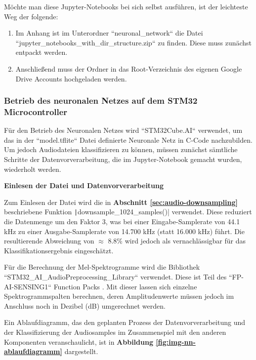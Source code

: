 Möchte man diese Jupyter-Notebooks bei sich selbst ausführen, ist der leichteste Weg der folgende:
\begin{enumerate}
  \item Im Anhang ist im Unterordner ``neuronal\_network`` die Datei ``jupyter\_notebooks\_with\_dir\_structure.zip`` zu finden. Diese muss zunächst entpackt werden.
  \item Anschließend muss der Ordner in das Root-Verzeichnis des eigenen Google Drive Accounts hochgeladen werden.
\end{enumerate}

\newpage

\subsubsection{Betrieb des neuronalen Netzes auf dem STM32 Microcontroller}
\label{sec:stm32-cube-ai}

Für den Betrieb des Neuronalen Netzes wird ``STM32Cube.AI`` verwendet, um das in der ``model.tflite`` Datei definierte Neuronale Netz in C-Code nachzubilden. Um jedoch Audiodateien klassifizieren zu können, müssen zunächst sämtliche Schritte der Datenvorverarbeitung, die im Jupyter-Notebook gemacht wurden, wiederholt werden.

\textbf{Einlesen der Datei und Datenvorverarbeitung}

Zum Einlesen der Datei wird die in \textbf{Abschnitt \ref{sec:audio-downsampling}} beschriebene Funktion \texttt|downsample_1024_samples()| verwendet. Diese reduziert die Datenmenge um den Faktor 3, was bei einer Eingabe-Samplerate von 44.1 kHz zu einer Ausgabe-Samplerate von 14.700 kHz (statt 16.000 kHz) führt. Die resultierende Abweichung von $\approx$ 8.8\% wird jedoch als vernachlässigbar für das Klassifikationsergebnis eingeschätzt.

Für die Berechnung der Mel-Spektrogramme wird die Bibliothek ``STM32\_AI\_AudioPreprocessing\_Library`` verwendet. Diese ist Teil des ``FP-AI-SENSING1`` Function Packs \cite{fp-ai-sensing1}. Mit dieser lassen sich einzelne Spektrogrammspalten berechnen, deren Amplitudenwerte müssen jedoch im Anschluss noch in Dezibel (dB) umgerechnet werden.

Ein Ablaufdiagramm, das den geplanten Prozess der Datenvorverarbeitung und der Klassifizierung der Audiosamples im Zusammenspiel mit den anderen Komponenten veranschaulicht, ist in \textbf{Abbildung \ref{fig:img-nn-ablaufdiagramm}} dargestellt.

